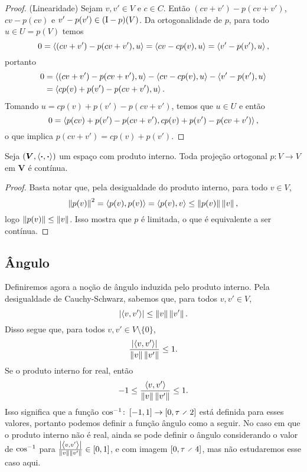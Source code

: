 \begin{proof}
(Linearidade) Sejam $v,v' \in V$ e $c \in C$. Então $(cv+v')-p(cv+v')$, $cv-p(cv)$ e $v'-p(v') \in (\mathrm{I}-p)(V)$. Da ortogonalidade de $p$, para todo $u \in U=p(V)$ temos
	\begin{equation*}
	0 = \left\langle{(cv+v')-p(cv+v')},{u}\right\rangle = \left\langle{cv-cp(v)},{u}\right\rangle = \left\langle{v'-p(v')},{u}\right\rangle,
	\end{equation*}
portanto
	\begin{align*}
	0 &= \left\langle{(cv+v')-p(cv+v')},{u}\right\rangle - \left\langle{cv-cp(v)},{u}\right\rangle - \left\langle{v'-p(v')},{u}\right\rangle \\
		&= \left\langle{cp(v) + p(v') - p(cv+v')},{u}\right\rangle.
	\end{align*}
Tomando $u=cp(v) + p(v') - p(cv+v')$, temos que $u \in U$ %
e então
 	\begin{equation*}
 	0 = \left\langle{p(cv) + p(v') - p(cv+v')},{cp(v) + p(v') - p(cv+v')}\right\rangle,
 	\end{equation*}
o que implica $p(cv+v') = cp(v) + p(v')$.
\end{proof}

\begin{proposition}
Seja $(\bm V, \left\langle{\bm{\cdot}},{\bm{\cdot}}\right\rangle)$ um espaço com produto interno. Toda projeção ortogonal $p\colon V \to V$ em $\bm V$ é contínua.
\end{proposition}
\begin{proof}
Basta notar que, pela desigualdade do produto interno, para todo $v \in V$,
	\begin{equation*}
	\left\Vert{p(v)}\right\Vert^2 = \left\langle{p(v)},{p(v)}\right\rangle = \left\langle{p(v)},{v}\right\rangle \leq \left\Vert{p(v)}\right\Vert\left\Vert{v}\right\Vert,
	\end{equation*}
logo $\left\Vert{p(v)}\right\Vert \leq \left\Vert{v}\right\Vert$. Isso mostra que $p$ é limitada, o que é equivalente a ser contínua.
\end{proof}




\subsection{Ângulo}

Definiremos agora a noção de ângulo induzida pelo produto interno. Pela desigualdade de Cauchy-Schwarz, sabemos que, para todos $v,v' \in V$,
	\begin{equation*}
	\left\vert{\left\langle{v},{v'}\right\rangle}\right\vert \leq \left\Vert{v}\right\Vert\left\Vert{v'}\right\Vert.
	\end{equation*}
Disso segue que, para todos $v,v' \in V\setminus\{0\}$,
	\begin{equation*}
	\frac{\left\vert{\left\langle{v},{v'}\right\rangle}\right\vert}{\left\Vert{v}\right\Vert\left\Vert{v'}\right\Vert} \leq 1.
	\end{equation*}
Se o produto interno for real, então
	\begin{equation*}
	-1 \leq \frac{\left\langle{v},{v'}\right\rangle}{\left\Vert{v}\right\Vert\left\Vert{v'}\right\Vert} \leq 1.
	\end{equation*}
Isso significa que a função $\cos\inv\colon \intff{-1}{1} \to \intff{0}{\tau \div 2}$ está definida para esses valores, portanto podemos definir a função ângulo como a seguir. No caso em que o produto interno não é real, ainda se pode definir o ângulo considerando o valor de $\cos^{-1}$ para $\frac{\left\vert{\left\langle{v},{v'}\right\rangle}\right\vert}{\left\Vert{v}\right\Vert\left\Vert{v'}\right\Vert}\in \left[{0},{1}\right]$, e com imagem $\intff{0}{\tau \div 4}$, mas não estudaremos esse caso aqui.

